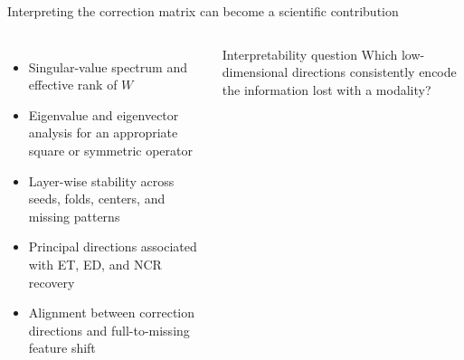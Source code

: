 \documentclass[aspectratio=169,11pt]{beamer}
\begin{document}
\begin{frame}{Interpreting the correction matrix can become a scientific contribution}
  \begin{columns}[T,onlytextwidth]
      \begin{itemize}
        \item Singular-value spectrum and effective rank of $W$
        \item Eigenvalue and eigenvector analysis for an appropriate square or symmetric operator
        \item Layer-wise stability across seeds, folds, centers, and missing patterns
        \item Principal directions associated with ET, ED, and NCR recovery
        \item Alignment between correction directions and full-to-missing feature shift
      \end{itemize}
      \begin{exampleblock}{Interpretability question}
        Which low-dimensional directions consistently encode the information lost with a modality?
      \end{exampleblock}
  \end{columns}
\end{frame}
\end{document}
